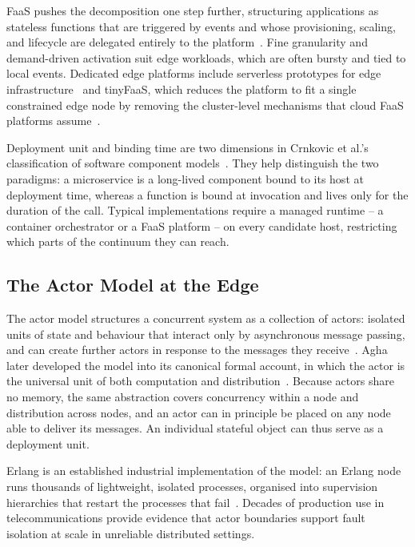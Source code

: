 \ac{FaaS} pushes the decomposition one step further,
structuring applications as stateless functions that are triggered by events and whose provisioning,
scaling,
and lifecycle are delegated entirely to the platform~\cite{DBLP:books/sp/17/BaldiniCCCFIMMRSS17}.
%
Fine granularity and demand-driven activation suit edge workloads,
which are often bursty and tied to local events.
Dedicated edge platforms include serverless prototypes for edge infrastructure~\cite{DBLP:conf/icfc/BaresiM19}
and tinyFaaS, which reduces the platform to fit a single constrained edge node by removing the cluster-level mechanisms that cloud \ac{FaaS} platforms assume~\cite{DBLP:conf/icfc/PfandzelterB20}.

Deployment unit and binding time are two dimensions in Crnkovic et al.'s classification of software component models~\cite{DBLP:journals/tse/CrnkovicSVC11}.
They help distinguish the two paradigms:
a microservice is a long-lived component bound to its host at deployment time,
whereas a function is bound at invocation and lives only for the duration of the call.
%
Typical implementations require a managed runtime -- a container orchestrator or a \ac{FaaS} platform -- on every candidate host,
restricting which parts of the continuum they can reach.

\subsection{The Actor Model at the Edge}
\label{subsec:actor-model-edge}

The actor model structures a concurrent system as a collection of actors:
isolated units of state and behaviour that interact only by asynchronous message passing,
and can create further actors in response to the messages they receive~\cite{DBLP:conf/ijcai/HewittBS73}.
%
Agha later developed the model into its canonical formal account,
in which the actor is the universal unit of both computation and distribution~\cite{DBLP:books/daglib/0066897}.
%
Because actors share no memory,
the same abstraction covers concurrency within a node and distribution across nodes,
and an actor can in principle be placed on any node able to deliver its messages.
%
An individual stateful object can thus serve as a deployment unit.

Erlang is an established industrial implementation of the model:
an Erlang node runs thousands of lightweight, isolated processes,
organised into supervision hierarchies that restart the processes that fail~\cite{DBLP:journals/cacm/Armstrong10}.
%
Decades of production use in telecommunications provide evidence that actor boundaries support fault isolation at scale in unreliable distributed settings.

